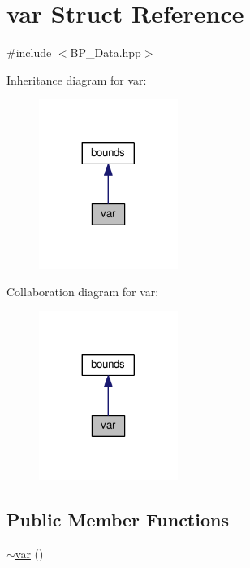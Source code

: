 \hypertarget{structvar}{\section{var Struct Reference}
\label{structvar}
}


{\ttfamily \#include $<$B\-P\-\_\-\-Data.\-hpp$>$}



Inheritance diagram for var\-:\nopagebreak
\begin{figure}[H]
\begin{center}
\leavevmode
\includegraphics[width=128pt]{structvar__inherit__graph}
\end{center}
\end{figure}


Collaboration diagram for var\-:\nopagebreak
\begin{figure}[H]
\begin{center}
\leavevmode
\includegraphics[width=128pt]{structvar__coll__graph}
\end{center}
\end{figure}
\subsection*{Public Member Functions}
\begin{DoxyCompactItemize}
\item 
\hyperlink{structvar_ac7d2944f98e9772ab540050ae22fe9d1}{$\sim$var} ()
\end{DoxyCompactItemize}

